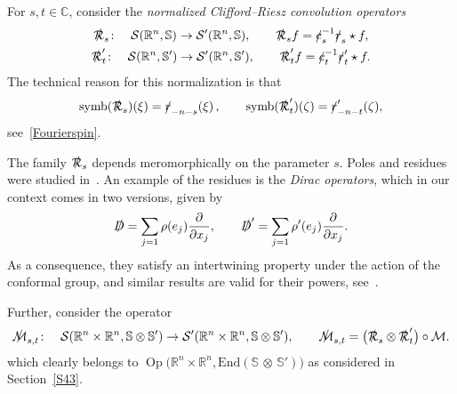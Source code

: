 \documentclass[10pt,a4paper]{amsart}
\DeclareMathOperator{\Op}{Op}
\DeclareMathOperator{\symb}{symb}
\newcommand{\fsl}[1]{{\slashed{#1}}} %
\numberwithin{equation}{section}
\begin{document}
For $s,t\in \mathbb C$, consider the \emph{normalized Clifford--Riesz convolution operators}
\begin{gather}
\fsl{\mathcal R}_s \colon\quad \mathcal S(\mathbb R^n, \mathbb S)\to \mathcal S'(\mathbb R^n, \mathbb S), \qquad
\fsl{\mathcal R}_s f = \fsl{c}_s^{-1}\fsl{r}_s \star f ,\nonumber
\\
\fsl{\mathcal R}'_t \colon\quad \mathcal S(\mathbb R^n, \mathbb S')\to \mathcal S'(\mathbb R^n, \mathbb S' ), \qquad
\fsl{\mathcal R}'_t f = \fsl{c}_t^{-1}\fsl{r}'_t \star f .\label{defCR}
\end{gather}
The technical reason for this normalization is that
\begin{gather*}
\symb(\fsl{\mathcal R}_s)(\xi) = \fsl{r}_{-n-s}(\xi)\, ,\qquad
\symb(\fsl{\mathcal R}'_t)(\zeta) = \fsl{r}'_{-n-t}(\zeta) ,
\end{gather*}
see~\eqref{Fourierspin}.

The family $\fsl{\mathcal R}_s$ depends meromorphically on the parameter $s$. Poles and residues were studied in~\cite{co}. An example of the residues is the \emph{Dirac operators}, which in our context comes in two versions, given by
\begin{gather*}\label{defDirac}
\fsl{D} = \sum_{j=1} \rho(e_j) \frac{\partial}{\partial x_j}, \qquad \fsl{D}' = \sum_{j=1} \rho'(e_j) \frac{\partial}{\partial x_j} .
\end{gather*}
As a consequence, they satisfy an intertwining property under the action of the conformal group, and similar results are valid for their powers, see~\cite{co}.

Further, consider the operator
\begin{gather*}
\fsl{\mathcal{M}}_{s,t} \colon\quad \mathcal S(\mathbb R^n\times \mathbb R^n, \mathbb S\otimes \mathbb S')\to \mathcal S'(\mathbb R^n\times \mathbb R^n, \mathbb S\otimes \mathbb S')
,\qquad \fsl{\mathcal{M}}_{s,t} = \big(\fsl{\mathcal R}_s\otimes \fsl{\mathcal R}'_t\big)\circ \mathcal M .
\end{gather*}
which clearly belongs to $\Op\big(\mathbb R^n\times \mathbb R^n, \mathrm{End}(\mathbb{S}\, \otimes\, \mathbb{S}')\big)$ as considered in Section~\ref{S43}.
\end{document}
